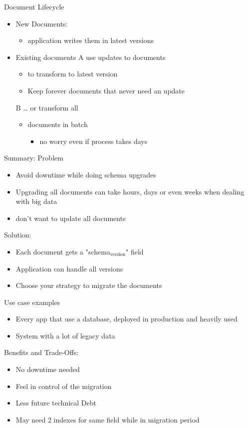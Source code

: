 \documentclass[11pt]{article}
\begin{document}
Document Lifecycle
\begin{itemize}
\item New Documents:
\begin{itemize}
\item application writes them in latest versions
\end{itemize}
\item Existing documents
A use updates to documents
\begin{itemize}
\item to transform to latest version
\item Keep forever documents that never need an update
\end{itemize}
B \ldots{} or transform all
\begin{itemize}
\item documents in batch
\begin{itemize}
\item no worry even if process takes days
\end{itemize}
\end{itemize}
\end{itemize}

Summary:
Problem
\begin{itemize}
\item Avoid downtime while doing schema upgrades
\item Upgrading all documents can take hours, days or even weeks when dealing with big data
\item don't want to update all documents
\end{itemize}

Solution:
\begin{itemize}
\item Each document gets a "schema\(_{\text{version}}\)" field
\item Application can handle all versions
\item Choose your strategy to migrate the documents
\end{itemize}

Use case examples
\begin{itemize}
\item Every app that use a database, deployed in production and heavily used
\item System with a lot of legacy data
\end{itemize}

Benefits and Trade-Offs:
\begin{itemize}
\item No downtime needed
\item Feel in control of the migration
\item Less future technical Debt
\item May need 2 indexes for same field while in migration period
\end{itemize}
\end{document}

